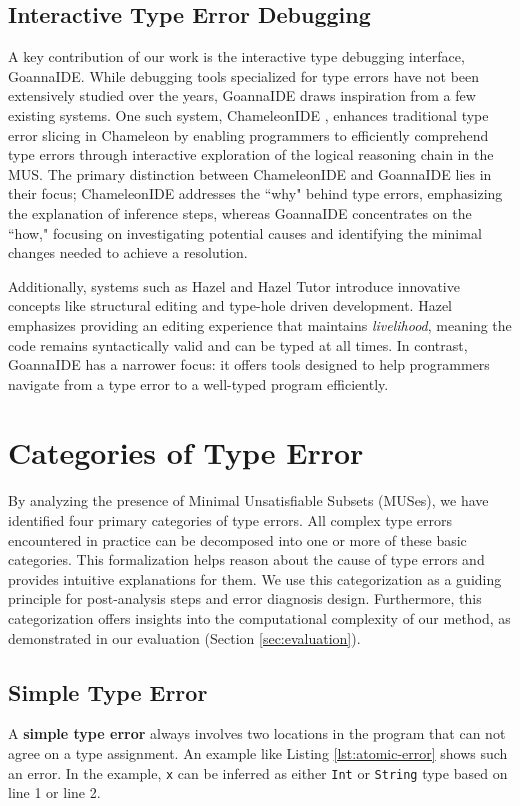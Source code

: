 \documentclass[pdflatex,lineno,sn-nature,Numbered]{sn-jnl}%
\begin{document}
\subsection{Interactive Type Error Debugging}
A key contribution of our work is the interactive type debugging interface, GoannaIDE. While debugging tools specialized for type errors have not been extensively studied over the years, GoannaIDE draws inspiration from a few existing systems. One such system, ChameleonIDE \cite{Fu2023-fm}, enhances traditional type error slicing in Chameleon \cite{Stuckey2003-pz} by enabling programmers to efficiently comprehend type errors through interactive exploration of the logical reasoning chain in the MUS. The primary distinction between ChameleonIDE and GoannaIDE lies in their focus; ChameleonIDE addresses the ``why" behind type errors, emphasizing the explanation of inference steps, whereas GoannaIDE concentrates on the ``how," focusing on investigating potential causes and identifying the minimal changes needed to achieve a resolution. 

Additionally, systems such as Hazel \cite{Zhao2024-qd} and Hazel Tutor \cite{Potter2020-tv} introduce innovative concepts like structural editing and type-hole driven development. Hazel emphasizes providing an editing experience that maintains {\it livelihood}, meaning the code remains syntactically valid and can be typed at all times. In contrast, GoannaIDE has a narrower focus: it offers tools designed to help programmers navigate from a type error to a well-typed program efficiently.

\section{Categories of Type Error} \label{sec:categories}

By analyzing the presence of Minimal Unsatisfiable Subsets (MUSes), we have identified four primary categories of type errors. All complex type errors encountered in practice can be decomposed into one or more of these basic categories. This formalization helps reason about the cause of type errors and provides intuitive explanations for them. We use this categorization as a guiding principle for post-analysis steps and error diagnosis design. Furthermore, this categorization offers insights into the computational complexity of our method, as demonstrated in our evaluation (Section \ref{sec:evaluation}).

\subsection{Simple Type Error}
A \textbf{simple type error} always involves two locations in the program that can not agree on a type assignment. An example like Listing \ref{lst:atomic-error} shows such an error. In the example, {\tt x} can be inferred as either {\tt Int} or {\tt String} type based on line 1 or line 2. 
\end{document}
